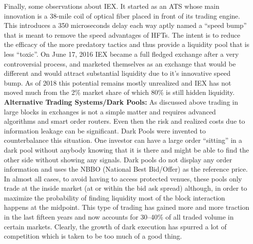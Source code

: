 Finally, some observations about IEX. It started as an ATS whose main innovation is a 38-mile coil of optical fiber placed in front of its trading engine. This introduces a 350 microseconds delay each way aptly named a ``speed bump'' that is meant to remove the speed advantages of HFTs. The intent is to reduce the efficacy of the more predatory tactics and thus provide a liquidity pool that is less ``toxic''. On June 17, 2016 IEX became a full fledged exchange after a very controversial process, and marketed themselves as an exchange that would be different and would attract substantial liquidity due to it's innovative speed bump. As of 2018 this potential remains mostly unrealized and IEX has not moved much from the 2\% market share of which 80\% is still hidden liquidity. \\


\noindent\textbf{Alternative Trading Systems/Dark Pools:} As discussed above trading in large blocks in exchanges is not a simple matter and requires advanced algorithms and smart order routers. Even then the risk and realized costs due to information leakage can be significant. Dark Pools were invented to counterbalance this situation. One investor can have a large order ``sitting'' in a dark pool without anybody knowing that it is there and might be able to find the other side without showing any signals. Dark pools do not display any order information and uses the NBBO (National Best Bid/Offer) as the reference price. In almost all cases, to avoid having to access protected venues, these pools only trade at the inside market (at or within the bid ask spread) although, in order to maximize the probability of finding liquidity most of the block interaction happens at the midpoint. This type of trading has gained more and more traction in the last fifteen years and now accounts for 30--40\% of all traded volume in certain markets. Clearly, the growth of dark execution has spurred a lot of competition which is taken to be too much of a good thing. 


